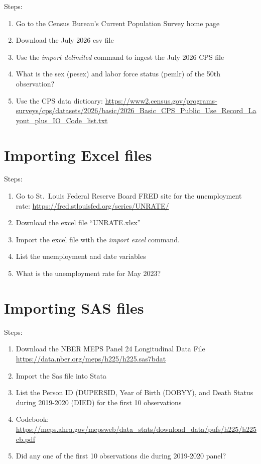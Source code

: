 \documentclass[
]{book}
\providecommand{\tightlist}{%
  \setlength{\itemsep}{0pt}\setlength{\parskip}{0pt}}
\begin{document}
Steps:

\begin{enumerate}
\def\labelenumi{\arabic{enumi}.}
\tightlist
\item
  Go to the Census Bureau's Current Population Survey home page
\item
  Download the July 2026 csv file
\item
  Use the \emph{import delimited} command to ingest the July 2026 CPS file
\item
  What is the sex (pesex) and labor force status (pemlr) of the 50th observation?
\item
  Use the CPS data dictioary: \url{https://www2.census.gov/programs-surveys/cps/datasets/2026/basic/2026_Basic_CPS_Public_Use_Record_Layout_plus_IO_Code_list.txt}
\end{enumerate}

\section{Importing Excel files}\label{importing-excel-files-1}

Steps:

\begin{enumerate}
\def\labelenumi{\arabic{enumi}.}
\tightlist
\item
  Go to St.~Louis Federal Reserve Board FRED site for the unemployment rate: \url{https://fred.stlouisfed.org/series/UNRATE/}
\item
  Download the excel file ``UNRATE.xlsx''
\item
  Import the excel file with the \emph{import excel} command.
\item
  List the unemployment and date variables
\item
  What is the unemployment rate for May 2023?
\end{enumerate}

\section{Importing SAS files}\label{importing-sas-files}

Steps:

\begin{enumerate}
\def\labelenumi{\arabic{enumi}.}
\tightlist
\item
  Download the NBER MEPS Panel 24 Longitudinal Data File \url{https://data.nber.org/meps/h225/h225.sas7bdat}
\item
  Import the Sas file into Stata
\item
  List the Person ID (DUPERSID, Year of Birth (DOBYY), and Death Status during 2019-2020 (DIED) for the first 10 observations
\item
  Codebook: \url{https://meps.ahrq.gov/mepsweb/data_stats/download_data/pufs/h225/h225cb.pdf}
\item
  Did any one of the first 10 observations die during 2019-2020 panel?
\end{enumerate}
\end{document}
